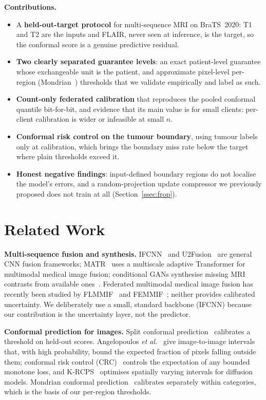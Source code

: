 \documentclass[conference]{IEEEtran}
\begin{document}
\noindent\textbf{Contributions.}
\begin{itemize}
    \item A \textbf{held-out-target protocol} for multi-sequence MRI on BraTS~2020: T1 and T2 are the inputs and FLAIR, never seen at inference, is the target, so the conformal score is a genuine predictive residual.
    \item \textbf{Two clearly separated guarantee levels}: an exact patient-level guarantee whose exchangeable unit is the patient, and approximate pixel-level per-region (Mondrian~\cite{vovk2005alrw}) thresholds that we validate empirically and label as such.
    \item \textbf{Count-only federated calibration} that reproduces the pooled conformal quantile bit-for-bit, and evidence that its main value is for small clients: per-client calibration is wider or infeasible at small $n$.
    \item \textbf{Conformal risk control on the tumour boundary}, using tumour labels only at calibration, which brings the boundary miss rate below the target where plain thresholds exceed it.
    \item \textbf{Honest negative findings}: input-defined boundary regions do not localise the model's errors, and a random-projection update compressor we previously proposed does not train at all (Section~\ref{ssec:frop}).
\end{itemize}

\section{Related Work}
\label{sec:related}

\noindent\textbf{Multi-sequence fusion and synthesis.} IFCNN~\cite{zhang2021ifcnn} and U2Fusion~\cite{xu2022u2fusion} are general CNN fusion frameworks; MATR~\cite{tang2022matr} uses a multiscale adaptive Transformer for multimodal medical image fusion; conditional GANs synthesise missing MRI contrasts from available ones~\cite{dar2019pgan}. Federated multimodal medical image fusion has recently been studied by FLMMIF~\cite{meng2026flmmif} and FEMMIF~\cite{alabduljabbar2026femmif}; neither provides calibrated uncertainty. We deliberately use a small, standard backbone (IFCNN) because our contribution is the uncertainty layer, not the predictor.

\noindent\textbf{Conformal prediction for images.} Split conformal prediction~\cite{vovk2005alrw,lei2018distribution} calibrates a threshold on held-out scores. Angelopoulos \textit{et al.}~\cite{angelopoulos2022im2im} give image-to-image intervals that, with high probability, bound the expected fraction of pixels falling outside them; conformal risk control (CRC)~\cite{angelopoulos2022crc} controls the expectation of any bounded monotone loss, and K-RCPS~\cite{teneggi2023krcps} optimises spatially varying intervals for diffusion models. Mondrian conformal prediction~\cite{vovk2005alrw} calibrates separately within categories, which is the basis of our per-region thresholds.
\end{document}
